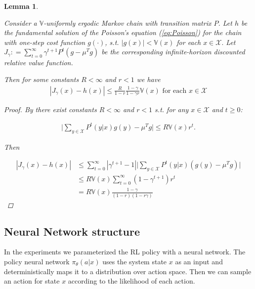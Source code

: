 \documentclass[11pt]{article}
\newcommand{\X}{\mathcal{X}}
\newcommand{\V}{\mathbb{V}}
\newtheorem{lemma}{Lemma}
\theoremstyle{definition}
\numberwithin{equation}{section}
\begin{document}
\begin{lemma}\label{lem:disc}

Consider a $\V$-uniformly ergodic Markov chain  with transition matrix $P$. Let $h $ be the fundamental solution of the Poisson's equation (\ref{eq:Poisson}) for the chain  with one-step cost function $g(\cdot)$,  s.t. $|g(x)|<\V(x)$ for each $x\in \X.$ Let $J_{  \gamma}: = \sum\limits_{t=0}^\infty \gamma^{t+1} P ^t (g -  \mu^T g ) $ be the corresponding infinite-horizon discounted relative value function.

 Then for some constants $R<\infty$ and $r<1$ we have
\begin{align*}
|J_{\gamma}(x) - h(x) |\leq \frac{R}{1-r}  \frac{1-\gamma}{1-\gamma r}\V(x) \text{ for each }x\in \X
\end{align*}


\begin{proof}

By \cite[Theorem 15.4.1]{Meyn2009}  there exist constants $R<\infty$ and $r<1$ s.t. for any $x\in \X$ and $t\geq 0$:

\begin{align*} 
\Big| \sum\limits_{y\in \X} P^t(y|x) g(y) - \mu^T g  \Big| \leq R\V(x) r^t.
\end{align*}

Then 


\begin{align*}
|J_{\gamma}(x) - h(x) | &\leq \sum\limits_{t=0}^\infty |\gamma^{t+1} - 1| \Big| \sum\limits_{y\in \X} P^t(y|x) (g(y) - \mu^T g)   \Big| \\
&\leq R \V(x) \sum\limits_{t=0}^\infty (1  - \gamma^{t+1}) r^t\\
&= R\V(x)\frac{1-\gamma}{(1-r)(1-r\gamma) }
\end{align*}

\end{proof}
\end{lemma}
  
\subsection{Neural Network structure}\label{sec:nn}







In the experiments we parameterized the RL policy with a neural network. The policy neural network $\pi_\theta(a|x)$ uses the system state $x$ as an input and deterministically maps it to a distribution over action space. Then we can sample an action for state $x$ according to the likelihood of each action.
\end{document}
